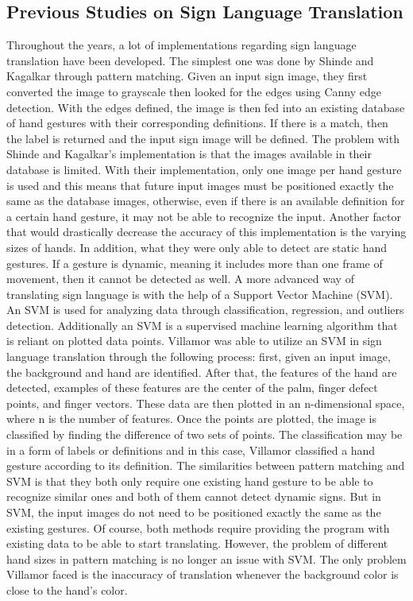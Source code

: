 \documentclass[journal]{./IEEE/IEEEtran}
\begin{document}
\subsection{Previous Studies on Sign Language Translation}
Throughout the years, a lot of implementations regarding sign language translation have been developed. The simplest one was done by Shinde and Kagalkar \cite{Shinde2015} through pattern matching. Given an input sign image, they first converted the image to grayscale then looked for the edges using Canny edge detection. With the edges defined, the image is then fed into an existing database of hand gestures with their corresponding definitions. If there is a match, then the label is returned and the input sign image will be defined.
\newline
\indent The problem with Shinde and Kagalkar's implementation is that the images available in their database is limited. With their implementation, only one image per hand gesture is used and this means that future input images must be positioned exactly the same as the database images, otherwise, even if there is an available definition for a certain hand gesture, it may not be able to recognize the input. Another factor that would drastically decrease the accuracy of this implementation is the varying sizes of hands. In addition, what they were only able to detect are static hand gestures. If a gesture is dynamic, meaning it includes more than one frame of movement, then it cannot be detected as well.
\newline
\indent A more advanced way of translating sign language is with the help of a Support Vector Machine (SVM). An SVM is used for analyzing data through classification, regression, and outliers detection. Additionally an SVM is a supervised machine learning algorithm that is reliant on plotted data points. Villamor \cite{Villamor2018} was able to utilize an SVM in sign language translation through the following process: first, given an input image, the background and hand are identified. After that, the features of the hand are detected, examples of these features are the center of the palm, finger defect points, and finger vectors. These data are then plotted in an n-dimensional space, where n is the number of features. Once the points are plotted, the image is classified by finding the difference of two sets of points. The classification may be in a form of labels or definitions and in this case, Villamor classified a hand gesture according to its definition.
\newline
\indent The similarities between pattern matching and SVM is that they both only require one existing hand gesture to be able to recognize similar ones and both of them cannot detect dynamic signs. But in SVM, the input images do not need to be positioned exactly the same as the existing gestures. Of course, both methods require providing the program with existing data to be able to start translating. However, the problem of different hand sizes in pattern matching is no longer an issue with SVM. The only problem Villamor faced is the inaccuracy of translation whenever the background color is close to the hand's color.
\end{document}
